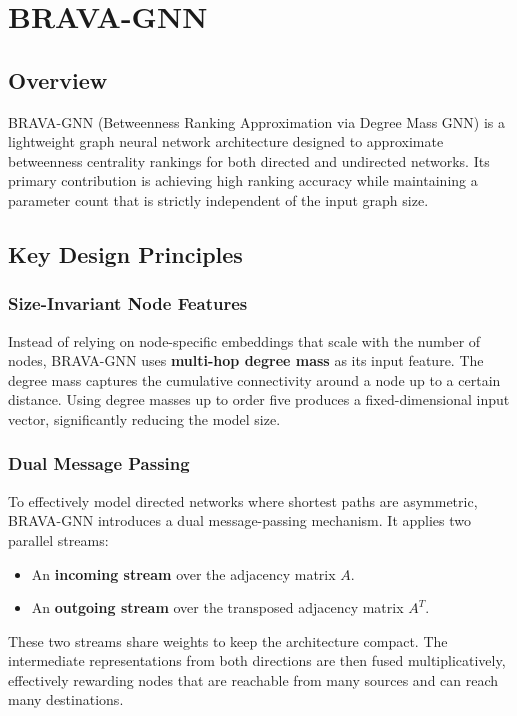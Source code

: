 \chapter{BRAVA-GNN}
\section{Overview}

BRAVA-GNN (Betweenness Ranking Approximation via Degree Mass GNN) is a lightweight graph neural network architecture designed to approximate betweenness centrality rankings for both directed and undirected networks. Its primary contribution is achieving high ranking accuracy while maintaining a parameter count that is strictly independent of the input graph size.

\section{Key Design Principles}

\subsection{Size-Invariant Node Features}
Instead of relying on node-specific embeddings that scale with the number of nodes, BRAVA-GNN uses \textbf{multi-hop degree mass} as its input feature. The degree mass captures the cumulative connectivity around a node up to a certain distance. Using degree masses up to order five produces a fixed-dimensional input vector, significantly reducing the model size.

\subsection{Dual Message Passing}
To effectively model directed networks where shortest paths are asymmetric, BRAVA-GNN introduces a dual message-passing mechanism. It applies two parallel streams:
\begin{itemize}
    \item An \textbf{incoming stream} over the adjacency matrix $A$.
    \item An \textbf{outgoing stream} over the transposed adjacency matrix $A^T$.
\end{itemize}
These two streams share weights to keep the architecture compact. The intermediate representations from both directions are then fused multiplicatively, effectively rewarding nodes that are reachable from many sources and can reach many destinations.

